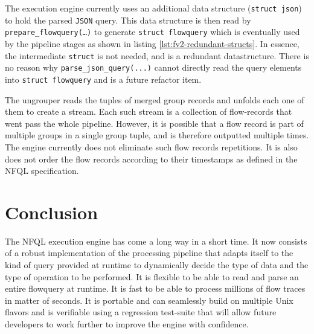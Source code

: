 The execution engine currently uses an additional data structure
(\texttt{struct json}) to hold the parsed \texttt{JSON} query. This data
structure is then read by \texttt{prepare\_flowquery(\ldots)} to generate
\texttt{struct flowquery} which is eventually  used by the pipeline stages as shown in listing
\ref{lst:fv2-redundant-structs}. In essence, the intermediate \texttt{struct}
is not needed, and is a redundant datastructure. There is no reason why
\texttt{parse\_json\_query(...)} cannot directly read the query elements into
\texttt{struct flowquery} and is a future refactor item.

The ungrouper reads the tuples of merged group records and unfolds each one of
them to create a stream. Each such stream is a collection of flow-records that
went  pass the whole
pipeline. However, it is possible that a flow record is part of multiple
groups in a single group tuple, and is therefore outputted multiple times. The
engine currently does not eliminate such flow records repetitions. It is also
does not order the flow records according to their timestamps as defined in
the \ac{NFQL} specification.




\section{Conclusion}\label{sec:conclusion}

The \ac{NFQL} execution engine has come a long way in a short time. It now
consists of a robust implementation of the processing pipeline that adapts
itself to the kind of query provided at runtime to dynamically decide the type
of data and the type of operation to be performed. It is flexible to be able
to read and parse an entire flowquery at runtime. It is fast to be able to
process millions of flow traces in matter of seconds. It is portable and can
seamlessly build on multiple Unix flavors and is verifiable using a regression
test-suite that will allow future developers to work further to improve the
engine with confidence.
